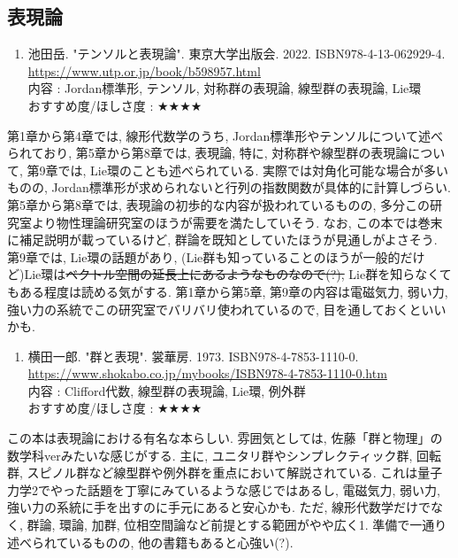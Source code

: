 \documentclass[10pt,a4paper]{jsarticle}
\begin{document}
\subsection{表現論}
    \begin{enumerate}
        \renewcommand{\theenumi}{[RE\arabic{enumi}]}
        \renewcommand{\labelenumi}{\theenumi}
        \setcounter{enumi}{0}
        \item \label{ITRE} 池田岳. "テンソルと表現論". 東京大学出版会. 2022. ISBN978-4-13-062929-4. \\
        \url{https://www.utp.or.jp/book/b598957.html} \\
        内容 : Jordan標準形, テンソル, 対称群の表現論, 線型群の表現論, Lie環\\
        おすすめ度/ほしさ度 : $\bigstar \bigstar \bigstar \bigstar $ 
    \end{enumerate}\par
    第1章から第4章では, 線形代数学のうち, Jordan標準形やテンソルについて述べられており, 第5章から第8章では, 表現論, 特に, 対称群や線型群の表現論について, 第9章では, Lie環のことも述べられている. 実際では対角化可能な場合が多いものの, Jordan標準形が求められないと行列の指数関数が具体的に計算しづらい. 第5章から第8章では, 表現論の初歩的な内容が扱われているものの, 多分この研究室より物性理論研究室のほうが需要を満たしていそう. なお, この本では巻末に補足説明が載っているけど, 群論を既知としていたほうが見通しがよさそう. 第9章では, Lie環の話題があり, (Lie群も知っていることのほうが一般的だけど)Lie環は\sout{ベクトル空間の延長上にあるようなものなので(?), }Lie群を知らなくてもある程度は読める気がする. 第1章から第5章, 第9章の内容は電磁気力, 弱い力, 強い力の系統でこの研究室でバリバリ使われているので, 目を通しておくといいかも. 
    \begin{enumerate}
        \renewcommand{\theenumi}{[RE\arabic{enumi}]}
        \renewcommand{\labelenumi}{\theenumi}
        \setcounter{enumi}{1}
        \item \label{YIRE} 横田一郎. "群と表現". 裳華房. 1973. ISBN978-4-7853-1110-0. \\
        \url{https://www.shokabo.co.jp/mybooks/ISBN978-4-7853-1110-0.htm} \\
        内容 : Clifford代数, 線型群の表現論, Lie環, 例外群\\
        おすすめ度/ほしさ度 : $\bigstar \bigstar \bigstar \bigstar $ 
    \end{enumerate}\par
    この本は表現論における有名な本らしい. 雰囲気としては, 佐藤「群と物理」の数学科verみたいな感じがする. 主に, ユニタリ群やシンプレクティック群, 回転群, スピノル群など線型群や例外群を重点において解説されている. これは量子力学2でやった話題を丁寧にみているような感じではあるし, 電磁気力, 弱い力, 強い力の系統に手を出すのに手元にあると安心かも. ただ, 線形代数学だけでなく, 群論, 環論, 加群, 位相空間論など前提とする範囲がやや広く1. 準備で一通り述べられているものの, 他の書籍もあると心強い(?). 
\end{document}
